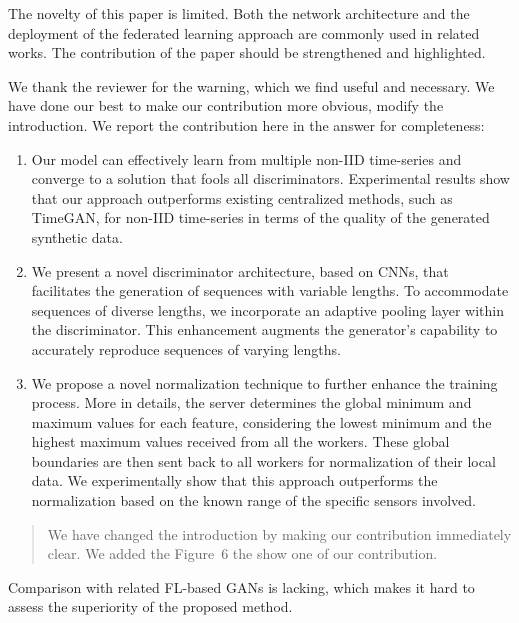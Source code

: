 \documentclass{article}
\begin{document}
\RC The novelty of this paper is limited. Both the network architecture and the deployment of the federated learning approach are commonly used in related works. The contribution of the paper should be strengthened and highlighted.

\AR  We thank the reviewer for the warning, which we find useful and necessary. We have done our best to make our contribution more obvious, modify the introduction. We report the contribution here in the answer for completeness:
    \begin{enumerate}
        \item Our model can effectively learn from multiple non-IID time-series and converge to a solution that fools all discriminators. Experimental results show that our approach outperforms existing centralized methods, such as TimeGAN, for non-IID time-series in terms of the quality of the generated synthetic data.
        \item We present a novel discriminator architecture, based on CNNs, that facilitates the generation of sequences with variable lengths. To accommodate sequences of diverse lengths, we incorporate an adaptive pooling layer within the discriminator. This enhancement augments the generator's capability to accurately reproduce sequences of varying lengths.
        \item We propose a novel normalization technique to further enhance the training process. More in details, the server determines the global minimum and maximum values for each feature, considering the lowest minimum and the highest maximum values received from all the workers. These global boundaries are then sent back to all workers for normalization of their local data. We experimentally show that this approach outperforms the normalization based on the known range of the specific sensors involved.
        \end{enumerate}


\begin{quote}
    We have changed the introduction by making our contribution immediately clear. We added the Figure~6 the show one of our contribution.
\end{quote}

\clearpage
\RC Comparison with related FL-based GANs is lacking, which makes it hard to assess the superiority of the proposed method.
\end{document}
